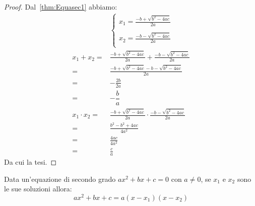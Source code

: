 \begin{proof}Dal~\vref{thm:Equasec1} abbiamo:
	\begin{align*}
	&\begin{cases}
	x_1=\frac{-b+\sqrt{b^2-4ac}}{2a}\\
	\\
	x_2=\frac{-b-\sqrt{b^2-4ac}}{2a}\\
	\end{cases}\\
	x_1+x_2=&\frac{-b+\sqrt{b^2-4ac}}{2a}+\frac{-b-\sqrt{b^2-4ac}}{2a}\\
	=&\frac{-b+\sqrt{b^2-4ac}-b-\sqrt{b^2-4ac}}{2a}\\
	=&-\frac{2b}{2a}\\
	=&-\dfrac{b}{a}\\
	x_1\cdot x_2=&\frac{-b+\sqrt{b^2-4ac}}{2a}\cdot\frac{-b-\sqrt{b^2-4ac}}{2a}\\
	=&\frac{b^2-b^2+4ac}{4a^2}\\
	=&\frac{4ac}{4a^2}\\
	=&\frac{c}{a}
	\end{align*}
	Da cui la tesi.
\end{proof}
\begin{cor}\label{cor:Scomposizionetrisecgrad}
Data un'equazione di secondo grado $ax^2+bx+c=0$ con $a\neq 0$, se $x_1$ e $x_2$ sono le sue soluzioni allora:\[ax^2+bx+c=a\left(x-x_1\right)\left(x-x_2\right) \]
\end{cor}
